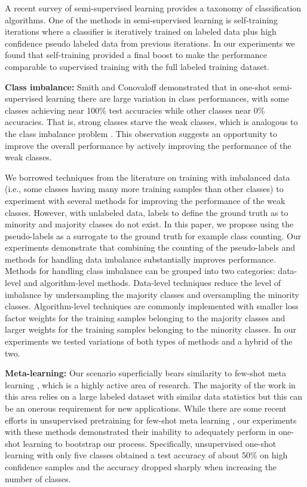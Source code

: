\documentclass[final]{cvpr}
\newcommand{\OSSSL}{one-shot semi-supervised learning }
\newcommand{\SSL}{semi-supervised learning }
\begin{document}
A recent survey of \SSL \cite{van2020survey} provides a taxonomy of classification algorithms.
One of the methods in \SSL is self-training iterations \cite{triguero2015self,rosenberg2005semi} where a classifier is iteratively trained on labeled data plus high confidence pseudo labeled data from previous iterations.
In our experiments we found that self-training provided a final boost to make the performance comparable to supervised training with the full labeled training dataset.

\textbf{Class imbalance:} 
Smith and Conovaloff \cite{smith2020empirical} demonstrated that in \OSSSL there are large variation in class performances, with some classes achieving near 100\% test accuracies while other classes near 0\% accuracies.
That is, strong classes starve the weak classes, which is analogous to the class imbalance problem \cite{johnson2019survey}.
This observation suggests an opportunity to improve the overall performance by actively improving the performance of the weak classes.

We borrowed techniques from the literature on training with imbalanced data \cite{johnson2019survey,wang2012multiclass,sun2007cost} (i.e., some classes having many more training samples than other classes) to experiment with several methods for improving the performance of the weak classes.
However, with unlabeled data, labels to define the ground truth as to minority and majority classes do not exist.
In this paper, we propose using the pseudo-labels as a surrogate to the ground truth for example class counting.
Our experiments demonstrate that combining the counting of the pseudo-labels and methods for handling data imbalance substantially improves performance.
Methods for handling class imbalance can be grouped into two categories: data-level and algorithm-level methods.
Data-level techniques \cite{wang2012multiclass} reduce the level of imbalance by undersampling the majority classes and oversampling the minority classes.
Algorithm-level techniques \cite{sun2007cost} are commonly implemented with smaller loss factor weights for the training samples belonging to the majority classes and larger weights for the training samples belonging to the minority classes.
In our experiments we tested variations of both types of methods and a hybrid of the two.



\textbf{Meta-learning:} 
Our scenario superficially bears similarity to few-shot meta learning \cite{koch2015siamese,vinyals2016matching,finn2017model,snell2017prototypical}, which is a highly active area of research.
The majority of the work in this area relies on a large labeled dataset with similar data statistics but this can be an onerous requirement for new applications.
While there are some recent efforts in unsupervised pretraining for few-shot meta learning \cite{hsu2018unsupervised,antoniou2019assume}, our experiments with these methods demonstrated their inability to adequately perform in one-shot learning to bootstrap our process.
Specifically, unsupervised one-shot learning with only five classes obtained a test accuracy of about 50\% on high confidence samples and the accuracy dropped sharply when increasing the number of classes.
\end{document}
